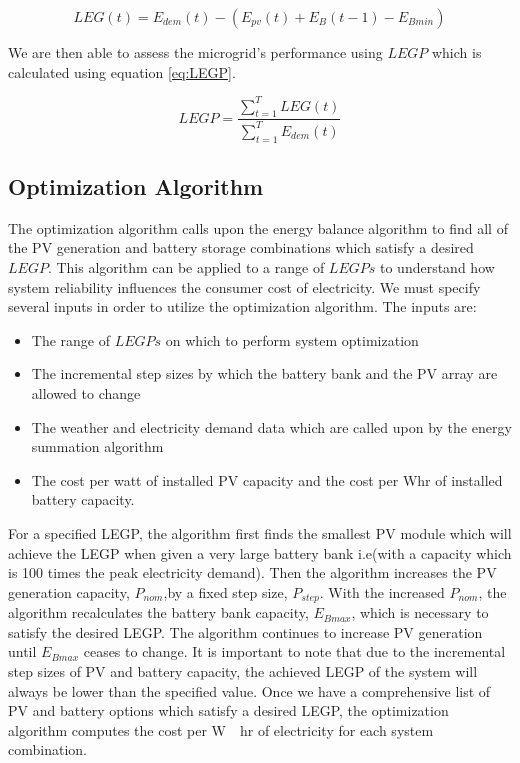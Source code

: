 \documentclass{article}
\begin{document}
\begin{equation} \label{eq:LEG}
LEG(t) = E_{dem} (t) - (E_{pv} (t)+E_B(t-1)-E_{Bmin})
\end{equation}

We are then able to assess the microgrid's performance using $LEGP$ which is calculated using equation \ref{eq:LEGP}.

\begin{equation} \label{eq:LEGP}
LEGP = \frac{\sum_{t=1}^T LEG(t)}{\sum_{t=1}^T E_{dem} (t)}
\end{equation}

\subsection{Optimization Algorithm}

The optimization algorithm calls upon the energy balance algorithm to find all of the PV generation and battery storage combinations which satisfy a desired $LEGP$. This algorithm can be applied to a range of $LEGPs$ to understand how system reliability influences the consumer cost of electricity. We must specify several inputs in order to utilize the optimization algorithm. The inputs are:

\begin{itemize}
\item The range of $LEGPs$ on which to perform system optimization
\item The incremental step sizes by which the battery bank and the PV array are allowed to change
\item The weather and electricity demand data which are called upon by the energy summation algorithm
\item The cost per watt of installed PV capacity and the cost per Whr of installed battery capacity. 
\end{itemize}

For a specified LEGP, the algorithm first finds the smallest PV module which will achieve the LEGP when given a very large battery bank i.e(with a capacity which is 100 times the peak electricity demand). 
Then the algorithm increases the PV generation capacity, $P_{nom}$,by a fixed step size, $P_{step}$.
With the increased $P_{nom}$, the algorithm recalculates the battery bank capacity, $E_{Bmax}$, which is necessary to satisfy the desired LEGP.
The algorithm continues to increase PV generation until $E_{Bmax}$ ceases to change. 
It is important to note that due to the incremental step sizes of PV and battery capacity, the achieved LEGP of the system will always be lower than the specified value. 
Once we have a comprehensive list of PV and battery options which satisfy a desired LEGP, the optimization algorithm computes the cost per \unit{W\cdot hr} of electricity for each system combination.
\end{document}
